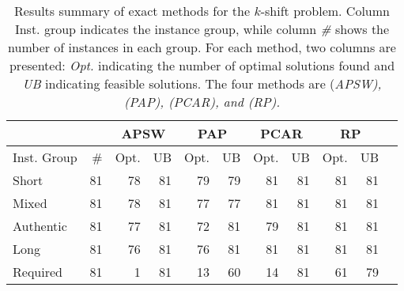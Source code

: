 \documentclass[preprint,12pt,authoryear]{elsarticle}
\begin{document}
\begin{table}[h!]
    \footnotesize
    \caption{Results summary of exact methods for the $k$-shift problem. Column {Inst. group} indicates the instance group, while column {\em \#} shows the number of instances in each group. For each method, two columns are presented: {\em Opt.} indicating the number of optimal solutions found and {\em UB} indicating feasible solutions. The four methods are \cite{Avriel1998StowageShifts} (\em APSW), \cite{Parreno-Torres2019SolutionProblem} ({\em PAP}), \cite{Parreno-Torres2021SolvingAlgorithm} ({\em PCAR}), and \cite{Roberti2018APlans} ({\em RP}).}
    \label{tab:k-shift-results}
    \centering
    \begin{tabular}{lrrrrrrrrrr}
        &      & \multicolumn{2}{c}{APSW}  &\multicolumn{2}{c}{PAP}  &\multicolumn{2}{c}{PCAR}  & \multicolumn{2}{c}{RP}\\\hline
Inst. Group & \#   & Opt.  & UB                & Opt.  & UB               & Opt.  & UB               & Opt.  & UB  \\\hline
Short       & 81   & 78    & 81                & 79    & 79               & 81    & 81               & 81    & 81 \\
Mixed       & 81   & 78    & 81                & 77    & 77               & 81    & 81               & 81    & 81 \\
Authentic   & 81   & 77    & 81                & 72    & 81               & 79    & 81               & 81    & 81 \\
Long        & 81   & 76    & 81                & 76    & 81               & 81    & 81               & 81    & 81 \\ 
Required    & 81   &  1    & 81                & 13    & 60               & 14    & 81               & 61    & 79 \\\hline
\end{tabular}

\end{table}
\end{document}
